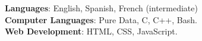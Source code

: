 \textbf{Languages}: English, Spanish, French (intermediate)
\\
\textbf{Computer Languages}: Pure Data, C, C++, Bash.
\\
\textbf{Web Development}: HTML, CSS, JavaScript.